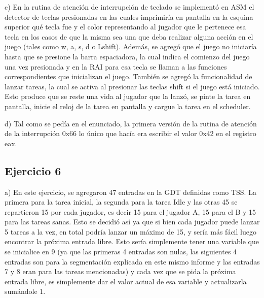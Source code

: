 \documentclass[a4paper]{article}
\begin{document}
c) En la rutina de atención de interrupción de teclado se implementó en ASM el detector de teclas presionadas en las cuales imprimiría en pantalla en la esquina
superior qué tecla fue y el color representando al jugador que le pertenece esa tecla en los casos de que la misma sea una que deba realizar alguna acción en el juego
(tales como w, a, s, d o Lshift). Además, se agregó que el juego no iniciaría hasta que se presione la barra espaciadora, la cual indica el comienzo del juego una vez presionada
y en la RAI para esa tecla se llaman a las funciones correspondientes que inicializan el juego. También se agregó la funcionalidad de lanzar tareas, la cual se activa al presionar las
teclas shift si el juego está iniciado. Esto produce que se reste una vida al jugador que la lanzó, se pinte la tarea en pantalla, inicie el reloj de la tarea en pantalla y cargue la tarea en el scheduler.

d) Tal como se pedía en el enunciado, la primera versión de la rutina de atención de la interrupción 0x66 lo único que hacía era escribir el valor 0x42 en el registro eax.


\subsection{Ejercicio 6}

a) En este ejercicio, se agregaron 47 entradas en la GDT definidas como TSS. La primera para la tarea inicial,
la segunda para la tarea Idle y las otras 45 se repartieron 15 por cada jugador, es decir 15 para el jugador A,
15 para el B y 15 para las tareas sanas. Esto se decidió así ya que si bien cada jugador puede lanzar 5 tareas
a la vez, en total podría lanzar un máximo de 15, y sería más fácil luego encontrar la próxima entrada libre.
Esto sería simplemente tener una variable que se inicialice en 9 (ya que las primeras 4 entradas son nulas, las siguientes
 4 entradas son para la segmentación explicada en este mismo informe y las entradas 7 y 8 eran para las tareas mencionadas)
y cada vez que se pida la próxima entrada libre, es simplemente dar el valor actual de esa variable y actualizarla sumándole 1.
\end{document}
